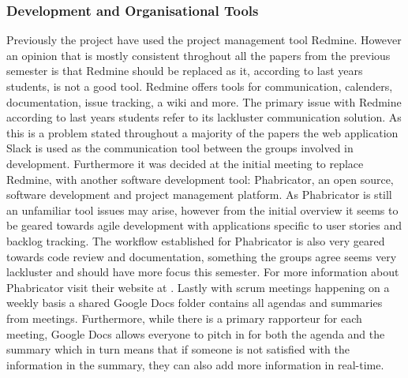 \subsubsection*{Development and Organisational Tools}
Previously the project have used the project management tool Redmine.
However an opinion that is mostly consistent throghout all the papers from the previous semester is that Redmine should be replaced as it, according to last years students, is not a good tool.
Redmine offers tools for communication, calenders, documentation, issue tracking, a wiki and more.
The primary issue with Redmine according to last years students refer to its lackluster communication solution.
As this is a problem stated throughout a majority of the papers the web application Slack is used as the communication tool between the groups involved in development.
Furthermore it was decided at the initial meeting to replace Redmine, with another software development tool: Phabricator, an open source, software development and project management platform. 
As Phabricator is still an unfamiliar tool issues may arise, however from the initial overview it seems to be geared towards agile development with applications specific to user stories and backlog tracking.
The workflow established for Phabricator is also very geared towards code review and documentation, something the groups agree seems very lackluster and should have more focus this semester.
For more information about Phabricator visit their website at \cite{phabricatorWebsite}.
Lastly with scrum meetings happening on a weekly basis a shared Google Docs folder contains all agendas and summaries from meetings.
Furthermore, while there is a primary rapporteur for each meeting, Google Docs allows everyone to pitch in for both the agenda and the summary which in turn means that if someone is not satisfied with the information in the summary, they can also add more information in real-time.
